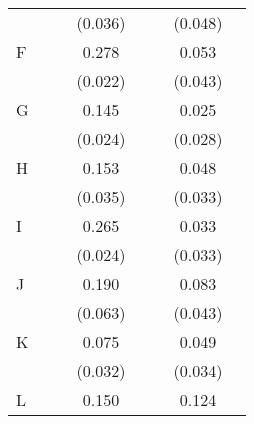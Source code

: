 \begin{longtable}{l*{3}{c}|l*{3}{c}}
	&                     &                     &     (0.036)         &                     &                     &     (0.048)         \\
	F                   &                     &                     &       0.278\sym{***}&                     &                     &       0.053         \\
	&                     &                     &     (0.022)         &                     &                     &     (0.043)         \\
	G                   &                     &                     &       0.145\sym{***}&                     &                     &       0.025         \\
	&                     &                     &     (0.024)         &                     &                     &     (0.028)         \\
	H                   &                     &                     &       0.153\sym{***}&                     &                     &       0.048         \\
	&                     &                     &     (0.035)         &                     &                     &     (0.033)         \\
	I                   &                     &                     &       0.265\sym{***}&                     &                     &       0.033         \\
	&                     &                     &     (0.024)         &                     &                     &     (0.033)         \\
	J                   &                     &                     &       0.190\sym{***}&                     &                     &       0.083\sym{*}  \\
	&                     &                     &     (0.063)         &                     &                     &     (0.043)         \\
	K                   &                     &                     &       0.075\sym{**} &                     &                     &       0.049         \\
	&                     &                     &     (0.032)         &                     &                     &     (0.034)         \\
	L                   &                     &                     &       0.150\sym{***}&                     &                     &       0.124\sym{***}\\

\end{longtable}
